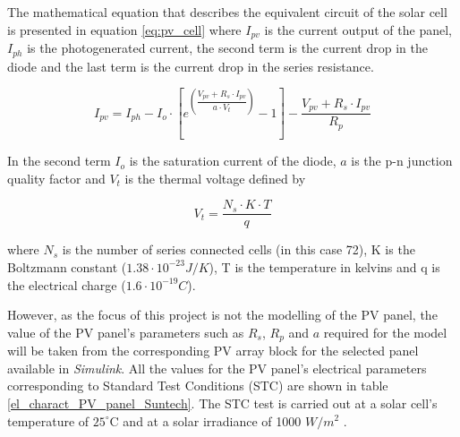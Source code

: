 The mathematical equation that describes the equivalent circuit of the solar cell is presented in equation \ref{eq:pv_cell}  where $I_{pv}$ is the current output of the panel, $I_{ph}$ is the photogenerated current, the second term is the current drop in the diode and the last term is the current drop in the series resistance. 

\begin{equation} \label{eq:pv_cell}
I_{pv} = I_{ph} - I_{o} \cdot \left[ e^{\left({\dfrac{V_{pv} + R_s\cdot I_{pv}}{a \cdot V_{t}}}\right)}  - 1 \right]  - \dfrac{V_{pv} + R_{s}\cdot I_{pv}}{R_{p}}
\end{equation}

In the second term $I_{o}$ is the saturation current of the diode, $a$ is the p-n junction quality factor  and $V_{t}$ is the thermal voltage defined by

\begin{equation} 
V_{t}=\dfrac{N_{s}\cdot K\cdot T}{q} 
\end{equation}

where $N_{s}$ is the number of series connected cells (in this case 72), K is the Boltzmann constant ($1.38 \cdot 10^{-23} J/K$), T is the temperature in kelvins and q is the electrical charge ($1.6 \cdot 10^{-19} C$).

However, as the focus of this project is not the modelling of the PV panel, the value of the PV panel's parameters such as $R_{s}$, $R_{p}$ and $a$ required for the model will be taken from the corresponding PV array block for the selected panel available in \textit{Simulink}. All the values for the PV panel's electrical parameters corresponding to Standard Test Conditions (STC) are shown in table \ref{el_charact_PV_panel_Suntech}. The STC test is carried out at a solar cell's temperature of $25^\circ$C and at a solar irradiance of 1000 $W/ m^2$ \cite{handbook}.

